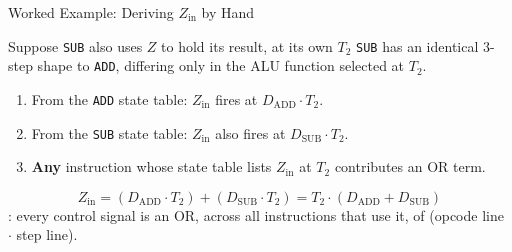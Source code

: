 \documentclass[aspectratio=169]{beamer}
\begin{document}
\begin{frame}{Worked Example: Deriving $Z_{\text{in}}$ by Hand}
  \begin{block}{Suppose \texttt{SUB} also uses $Z$ to hold its result, at its own $T_2$}
    \texttt{SUB} has an identical 3-step shape to \texttt{ADD}, differing only in
    the ALU function selected at $T_2$.
  \end{block}
  \begin{enumerate}
    \item From the \texttt{ADD} state table: $Z_{\text{in}}$ fires at $D_{\text{ADD}} \cdot T_2$.
    \item From the \texttt{SUB} state table: $Z_{\text{in}}$ also fires at $D_{\text{SUB}} \cdot T_2$.
    \item \textbf{Any} instruction whose state table lists $Z_{\text{in}}$ at $T_2$
      contributes an OR term.
  \end{enumerate}
  \[
    Z_{\text{in}} = (D_{\text{ADD}} \cdot T_2) + (D_{\text{SUB}} \cdot T_2) = T_2 \cdot (D_{\text{ADD}} + D_{\text{SUB}})
  \]
  : every control signal is an OR, across all
  instructions that use it, of (opcode line $\cdot$ step line).
\end{frame}
\end{document}
